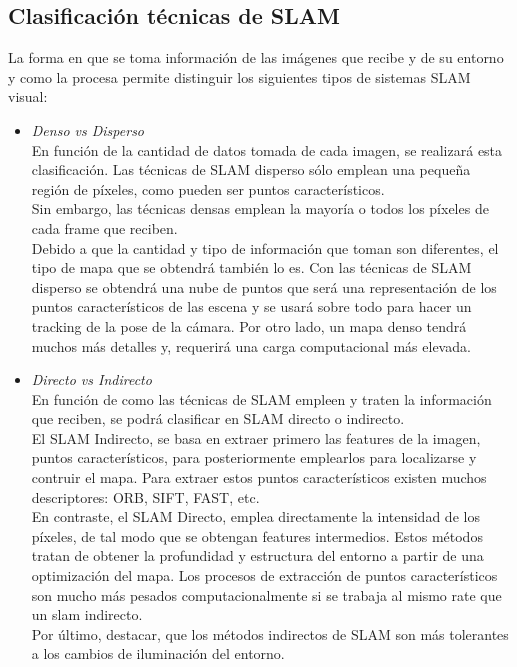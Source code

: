 \subsection{Clasificación técnicas de SLAM}
La forma en que se toma información de las imágenes que recibe y de su entorno y como la procesa permite distinguir los siguientes tipos de sistemas
SLAM visual:
\begin{itemize}
\item \textit{Denso vs Disperso} \\
En función de la cantidad de datos tomada de cada imagen, se realizará esta clasificación. Las técnicas de SLAM disperso sólo emplean una pequeña
región de píxeles, como pueden ser puntos característicos. \\
Sin embargo, las técnicas densas emplean la mayoría o todos los píxeles de cada frame que reciben. \\

Debido a que la cantidad y tipo de información que toman son diferentes, el tipo de mapa que se obtendrá también lo es. Con las técnicas de SLAM
disperso se obtendrá una nube de puntos que será una representación de los puntos característicos de las escena y se usará sobre todo para hacer
un tracking de la pose de la cámara. Por otro lado, un mapa denso tendrá muchos más detalles y, requerirá una carga computacional más elevada.

 \item \textit{Directo vs Indirecto} \\
En función de como las técnicas de SLAM empleen y traten la información que reciben, se podrá clasificar en SLAM directo o indirecto.\\
El SLAM Indirecto, se basa en extraer primero las features de la imagen, puntos característicos, para posteriormente emplearlos para localizarse y contruir
el mapa. Para extraer estos puntos característicos existen muchos descriptores: ORB, SIFT, FAST, etc. \\

En contraste, el SLAM Directo, emplea directamente la intensidad de los píxeles, de tal modo que se obtengan features intermedios. Estos métodos tratan de 
obtener la profundidad y estructura del entorno a partir de una optimización del mapa. Los procesos de extracción de puntos característicos son mucho más
pesados computacionalmente si se trabaja al mismo rate que un slam indirecto.\\
Por último, destacar, que los métodos indirectos de SLAM son más tolerantes a los cambios de iluminación del entorno.\\


\end{itemize}
